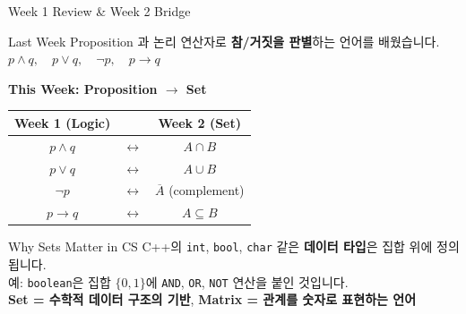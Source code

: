 \documentclass{beamer}
\begin{document}
\begin{frame}[t,shrink=5]{Week 1 Review \& Week 2 Bridge}
    \small
    \vspace{0.1cm}
    \begin{block}{Last Week}
        \footnotesize Proposition 과 논리 연산자로 \textbf{참/거짓을 판별}하는 언어를 배웠습니다.\\
        $p \land q, \quad p \lor q, \quad \neg p, \quad p \rightarrow q$
    \end{block}

    \vspace{0.15cm}
    \textbf{This Week: Proposition $\to$ Set}

    \begin{center}
    \footnotesize
    \renewcommand{\arraystretch}{1.3}
    \begin{tabular}{ccc}
        \toprule
        \textbf{Week 1 (Logic)} & & \textbf{Week 2 (Set)} \\
        \midrule
        $p \land q$ & $\longleftrightarrow$ & $A \cap B$ \\
        $p \lor q$  & $\longleftrightarrow$ & $A \cup B$ \\
        $\neg p$    & $\longleftrightarrow$ & $\overline{A}$ (complement) \\
        $p \rightarrow q$ & $\longleftrightarrow$ & $A \subseteq B$ \\
        \bottomrule
    \end{tabular}
    \renewcommand{\arraystretch}{1}
    \end{center}

    \vspace{0.1cm}
    \begin{exampleblock}{Why Sets Matter in CS}
        \footnotesize
        C++의 \texttt{int}, \texttt{bool}, \texttt{char} 같은 \textbf{데이터 타입}은 집합 위에 정의됩니다.\\
        예: \texttt{boolean}은 집합 $\{0, 1\}$에 \texttt{AND}, \texttt{OR}, \texttt{NOT} 연산을 붙인 것입니다.\\[2pt]
        \textbf{Set = 수학적 데이터 구조의 기반}, \textbf{Matrix = 관계를 숫자로 표현하는 언어}
    \end{exampleblock}
\end{frame}

\end{document}
